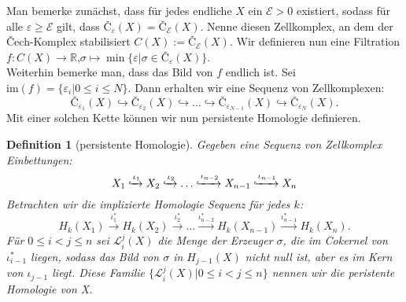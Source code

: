 \documentclass[11pt, a4paper,draft]{report}
\newtheorem{definition}{Definition}
\newcommand{\bR}{\mathbb{R}}
\newcommand{\im}{\textrm{im}}
\begin{document}
	Man bemerke zunächst, dass für jedes endliche $X$ ein $\mathcal{E}>0$ existiert, sodass für alle $\varepsilon\geq\mathcal{E}$ gilt, dass $Č_\varepsilon(X) = Č_\mathcal{E}(X)$. Nenne diesen Zellkomplex, an dem der Čech-Komplex stabilisiert $C(X):=Č_\mathcal{E}(X)$. Wir definieren nun eine Filtration $f:C(X)\rightarrow\bR$,$\sigma\mapsto\min\{\varepsilon|\sigma\in Č_\varepsilon(X)\}$.\\
	Weiterhin bemerke man, dass das Bild von $f$ endlich ist. Sei $\im(f)=\{\varepsilon_i|0\leq i\leq N\}$. Dann erhalten wir eine Sequenz von Zellkomplexen:
	$$Č_{\varepsilon_1}(X)\hookrightarrow Č_{\varepsilon_2}(X)\hookrightarrow \ldots \hookrightarrow Č_{\varepsilon_{N-1}}(X)\hookrightarrow Č_{\varepsilon_N}(X).$$
	Mit einer solchen Kette können wir nun persistente Homologie definieren.
	\begin{definition}[persistente Homologie]
		Gegeben eine Sequenz von Zellkomplex Einbettungen: $$X_1\xhookrightarrow{\iota_1} X_2\xhookrightarrow{\iota_2} \ldots\xhookrightarrow{\iota_{n-2}} X_{n-1}\xhookrightarrow{\iota_{n-1}} X_n$$
		Betrachten wir die implizierte Homologie Sequenz für jedes $k$:
		$$H_k(X_1)\xrightarrow{\iota_{1}^*} H_k(X_2)\xrightarrow{\iota_{2}^*}\ldots \xrightarrow{\iota_{n-2}^*} H_k(X_{n-1})\xrightarrow{\iota_{n-1}^*} H_k(X_n).$$
		Für $0\leq i<j\leq n$ sei $\mathcal{L}_i^j(X)$ die Menge der Erzeuger $\sigma$, die im Cokernel von $\iota_{i-1}^*$ liegen, sodass das Bild von $\sigma$ in $H_{j-1}(X)$ nicht null ist, aber es im Kern von $\iota_{j-1}$ liegt. Diese Familie $\{\mathcal{L}_i^j(X)|0\leq i<j\leq n\}$ nennen wir die peristente Homologie von X.
	\end{definition}
\end{document}
